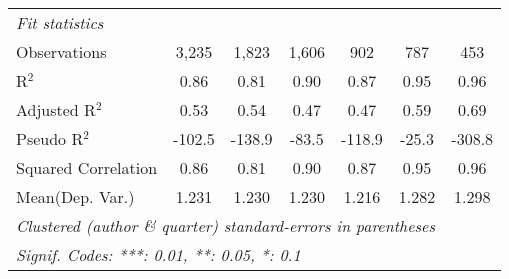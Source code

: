 \begin{tabular}{lcccccc}
   \midrule
   \emph{Fit statistics}\\
   Observations                                               & 3,235   & 1,823        & 1,606         & 902     & 787            & 453\\  
   R$^2$                                                      & 0.86    & 0.81         & 0.90          & 0.87    & 0.95           & 0.96\\  
   Adjusted R$^2$                                             & 0.53    & 0.54         & 0.47          & 0.47    & 0.59           & 0.69\\  
   Pseudo R$^2$                                               & -102.5  & -138.9       & -83.5         & -118.9  & -25.3          & -308.8\\  
   Squared Correlation                                        & 0.86    & 0.81         & 0.90          & 0.87    & 0.95           & 0.96\\  
Mean(Dep. Var.) & 1.231 & 1.230 & 1.230 & 1.216 & 1.282 & 1.298 \\
   \midrule \midrule
   \multicolumn{7}{l}{\emph{Clustered (author \& quarter) standard-errors in parentheses}}\\
   \multicolumn{7}{l}{\emph{Signif. Codes: ***: 0.01, **: 0.05, *: 0.1}}\\
\end{tabular}
\par\endgroup
